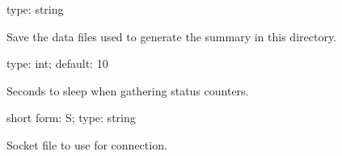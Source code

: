 \documentclass[letterpaper,10pt,english]{sphinxmanual}
\begin{document}
\begin{fulllineitems}
\label{\detokenize{mariadb-database-summary:cmdoption-mariadb-database-summary-save-samples}}
type: string

Save the data files used to generate the summary in this directory.

\end{fulllineitems}


\begin{fulllineitems}
\label{\detokenize{mariadb-database-summary:cmdoption-mariadb-database-summary-sleep}}
type: int; default: 10

Seconds to sleep when gathering status counters.

\end{fulllineitems}


\begin{fulllineitems}
\label{\detokenize{mariadb-database-summary:cmdoption-mariadb-database-summary-socket}}
short form: \sphinxhyphen{}S; type: string

Socket file to use for connection.

\end{fulllineitems}
\end{document}
